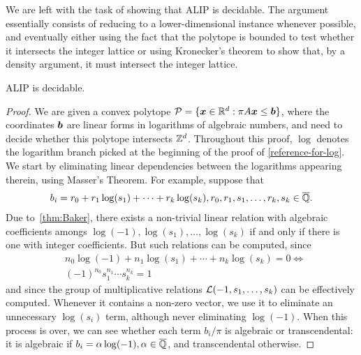 We are left with the task of showing that ALIP is decidable. The argument essentially consists of reducing to a lower-dimensional instance whenever possible, and eventually either using the fact that the polytope is bounded to test whether it intersects the integer lattice or using Kronecker's theorem to show that, by a density argument, it must intersect the integer lattice.

\begin{theorem}
ALIP is decidable.
\end{theorem}

\begin{proof}
We are given a convex polytope $\mathcal{P}=\lbrace \boldsymbol{x} \in \mathbb{R}^{d} : \pi A \boldsymbol{x} \leq \boldsymbol{b} \rbrace$, where the coordinates $\boldsymbol{b}$ are linear forms in logarithms of algebraic numbers, and need to decide whether this polytope intersects $\mathbb{Z}^{d}$. Throughout this proof, $\log$ denotes the logarithm branch picked at the beginning of the proof of \cref{reference-for-log}. We start by eliminating linear dependencies between the logarithms appearing therein, using Masser's Theorem. For example, suppose that
\begin{align*}
b_{i} = r_{0} + r_{1} \log(s_{1}) + \cdots + r_{k} \log(s_{k}), r_{0}, r_{1}, s_{1}, \ldots, r_{k}, s_{k} \in \overline{\mathbb{Q}}.
\end{align*}
Due to~\cref{thm:Baker}, there exists a non-trivial linear relation with algebraic coefficients amongs $\log(-1), \log(s_{1}), \ldots, \log(s_{k})$ if and only if there is one with integer coefficients. But such relations can be computed, since
\begin{align*}
&n_{0} \log(-1) + n_{1} \log(s_{1}) + \cdots + n_{k} \log(s_{k}) = 0 \Leftrightarrow \\
&(-1)^{n_{0}} s_{1}^{n_{1}} \cdots s_{k}^{n_{k}} = 1
\end{align*}
and since the group of multiplicative relations ${\cal{L}}(-1, s_{1}, \ldots, s_{k})$ can be effectively computed. Whenever it contains a non-zero vector, we use it to eliminate an unnecessary $\log(s_{i})$ term, although never eliminating $\log(-1)$. When this process is over, we can see whether each term $b_{i}/\pi$ is algebraic or transcendental: it is algebraic if $b_{i} = \alpha \log(-1), \alpha \in \overline{\mathbb{Q}}$, and transcendental otherwise.


\end{proof}
